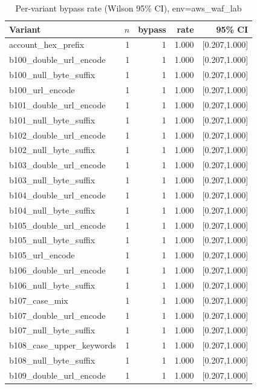 \begin{table}[t]
\centering
\small
\caption{Per-variant bypass rate (Wilson 95\% CI), env=aws_waf_lab}
\label{tab:probe-bypass-rates}
\begin{tabular}{lrrrr}
\hline
Variant & $n$ & bypass & rate & 95\% CI \\
\hline
account\_hex\_prefix & 1 & 1 & 1.000 & [0.207,1.000] \\
b100\_double\_url\_encode & 1 & 1 & 1.000 & [0.207,1.000] \\
b100\_null\_byte\_suffix & 1 & 1 & 1.000 & [0.207,1.000] \\
b100\_url\_encode & 1 & 1 & 1.000 & [0.207,1.000] \\
b101\_double\_url\_encode & 1 & 1 & 1.000 & [0.207,1.000] \\
b101\_null\_byte\_suffix & 1 & 1 & 1.000 & [0.207,1.000] \\
b102\_double\_url\_encode & 1 & 1 & 1.000 & [0.207,1.000] \\
b102\_null\_byte\_suffix & 1 & 1 & 1.000 & [0.207,1.000] \\
b103\_double\_url\_encode & 1 & 1 & 1.000 & [0.207,1.000] \\
b103\_null\_byte\_suffix & 1 & 1 & 1.000 & [0.207,1.000] \\
b104\_double\_url\_encode & 1 & 1 & 1.000 & [0.207,1.000] \\
b104\_null\_byte\_suffix & 1 & 1 & 1.000 & [0.207,1.000] \\
b105\_double\_url\_encode & 1 & 1 & 1.000 & [0.207,1.000] \\
b105\_null\_byte\_suffix & 1 & 1 & 1.000 & [0.207,1.000] \\
b105\_url\_encode & 1 & 1 & 1.000 & [0.207,1.000] \\
b106\_double\_url\_encode & 1 & 1 & 1.000 & [0.207,1.000] \\
b106\_null\_byte\_suffix & 1 & 1 & 1.000 & [0.207,1.000] \\
b107\_case\_mix & 1 & 1 & 1.000 & [0.207,1.000] \\
b107\_double\_url\_encode & 1 & 1 & 1.000 & [0.207,1.000] \\
b107\_null\_byte\_suffix & 1 & 1 & 1.000 & [0.207,1.000] \\
b108\_case\_upper\_keywords & 1 & 1 & 1.000 & [0.207,1.000] \\
b108\_null\_byte\_suffix & 1 & 1 & 1.000 & [0.207,1.000] \\
b109\_double\_url\_encode & 1 & 1 & 1.000 & [0.207,1.000] \\

\end{tabular}
\end{table}
